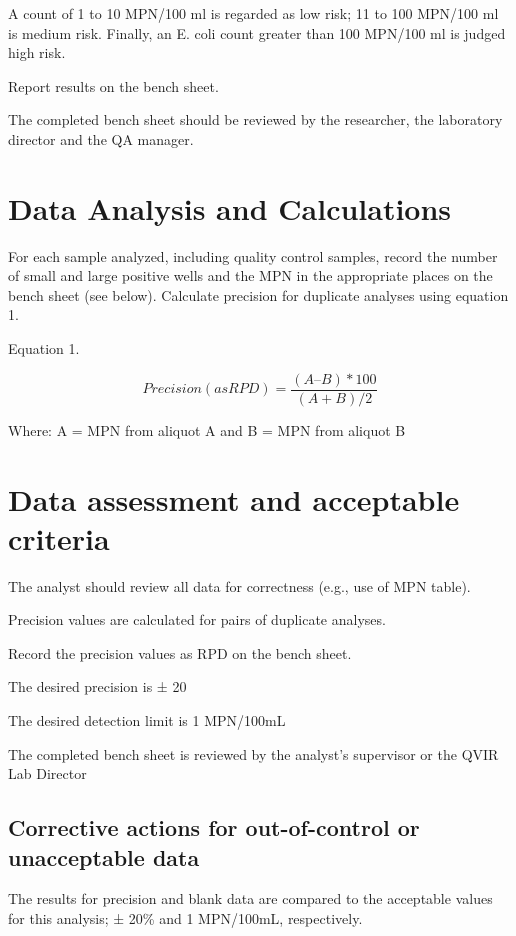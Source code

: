 \documentclass[12pt]{../SOP4_alpha}\usepackage[]{graphicx}\usepackage[]{xcolor}
\begin{document}
\NP A count of 1 to 10 MPN/100 ml is regarded as low risk; 11 to 100 MPN/100 ml is medium risk. Finally, an E. coli count greater than 100 MPN/100 ml is judged high risk.


\NP Report results on the bench sheet.

\NP The completed bench sheet should be reviewed by the researcher, the
laboratory director and the QA manager. 


\section{Data Analysis and Calculations}

\NP For each sample analyzed, including quality control samples, record
the number of small and large positive wells and the MPN in the
appropriate places on the bench sheet (see below). Calculate
precision for duplicate analyses using equation 1.

\NP Equation 1. 

\begin{equation}
Precision (as RPD) = \frac{(A – B)*100}{(A + B)/2}
\end{equation}

Where: A = MPN from aliquot A and
 B = MPN from aliquot B 
 

\section{Data assessment and acceptable criteria}

\NP The analyst should review all data for correctness (e.g., use of MPN table).

\NP Precision values are calculated for pairs of duplicate analyses.

\NP Record the precision values as RPD on the bench sheet.

\NP The desired precision is ± 20%

\NP The desired detection limit is 1 MPN/100mL

\NP The completed bench sheet is reviewed by the analyst's supervisor or the
QVIR Lab Director 


\subsection{Corrective actions for out-of-control or unacceptable data}

\NP The results for precision and blank data are compared to the
acceptable values for this analysis; ± 20\% and 1 MPN/100mL,
respectively.
\end{document}
